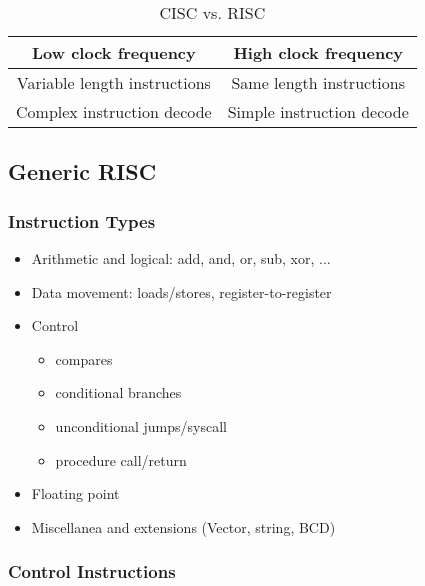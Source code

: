 \documentclass[12pt]{article}
\begin{document}
\begin{itemize}
\begin{table}[]
\begin{tabular}{cc}
\multicolumn{1}{|c|}{Low clock frequency}                                                                           & \multicolumn{1}{c|}{High clock frequency}                                                                             \\ \hline
\multicolumn{1}{|c|}{Variable length instructions}                                                                  & \multicolumn{1}{c|}{Same length instructions}                                                                         \\ \hline
\multicolumn{1}{|c|}{Complex instruction decode}                                                                    & \multicolumn{1}{c|}{Simple instruction decode}                                                                        \\ \hline
\end{tabular}
                            \caption{CISC vs. RISC}
                        \end{table}
                \end{itemize}
        \subsection{Generic RISC}
            \subsubsection{Instruction Types}
                \begin{itemize}
                    \item {Arithmetic and logical: add, and, or, sub, xor, ...}
                    \item {Data movement: loads/stores, register-to-register}
                    \item {Control}
                        \begin{itemize}
                            \item {compares}
                            \item {conditional branches}
                            \item {unconditional jumps/syscall}
                            \item {procedure call/return}
                        \end{itemize}
                    \item {Floating point}
                    \item {Miscellanea and extensions (Vector, string, BCD)}
                \end{itemize}
            \subsubsection{Control Instructions}
\end{document}
